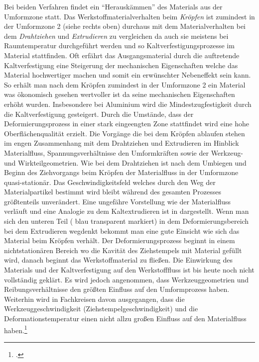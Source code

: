\documentclass[12pt,a4paper,parskip]{scrartcl}
\begin{document}
Bei beiden Verfahren findet ein "`Herauskämmen"' des Materials aus der Umformzone statt. Das Werkstoffmaterialverhalten beim \emph{Kröpfen} ist zumindest in der Umformzone 2 (siehe  rechts oben) durchaus mit dem Materialverhalten bei dem \emph{Drahtziehen} und \emph{Extrudieren} zu vergleichen da auch sie meistens bei Raumtemperatur durchgeführt werden und so Kaltverfestigungsprozesse im Material stattfinden. Oft erfährt das Ausgangsmaterial durch die auftretende Kaltverfestigung        
eine Steigerung der mechanischen Eigenschaften welche das Material hochwertiger machen und somit ein erwünschter Nebeneffekt sein kann. So erhält man nach dem Kröpfen zumindest in der Umformzone 2 ein Material was ökonomisch gesehen wertvoller ist da seine mechanischen Eigenschaften erhöht wurden. Insbesondere bei Aluminium wird die Mindestzugfestigkeit durch die Kaltverfestigung gesteigert. Durch die Umstände, dass der Deformierungsprozess in einer stark eingeengten Zone stattfindet wird eine hohe Oberflächenqualität erzielt. Die Vorgänge die bei dem Kröpfen ablaufen stehen im engen Zusammenhang mit dem Drahtziehen und Extrudieren im Hinblick  Materialfluss, Spannungsverhältnisse den Umformkräften sowie der Werkzeug- und Wirkteilgeometrien. Wie bei dem Drahtziehen ist nach dem Umbiegen und Beginn des Ziehvorgangs beim Kröpfen der Materialfluss in der Umformzone quasi-stationär. Das Geschwindigkeitsfeld welches durch den Weg der Materialpartikel bestimmt wird bleibt während des gesamten Prozesses größtenteils unverändert. Eine ungefähre Vorstellung wie der Materialfluss verläuft und  eine Analogie zu dem Kaltextrudieren ist in  dargestellt. Wenn man sich den unteren Teil ( blau transparent markiert) in dem Deformierungsbereich bei dem Extrudieren wegdenkt bekommt man  eine gute Einsicht wie sich das Material beim Kröpfen verhält. Der Deformierungsprozess beginnt in einem nichtstationären Bereich wo die Kavität des Ziehstempels mit Material gefüllt wird, danach beginnt das  Werkstoffmaterial zu fließen. Die Einwirkung des Materials und der Kaltverfestigung auf den Werkstofffluss ist bis heute noch nicht vollständig geklärt. Es wird jedoch angenommen, dass  
Werkzeuggeometrien und Reibungsverhältnisse den größten Einfluss auf den Umformprozess haben. Weiterhin wird in Fachkreisen davon ausgegangen, dass die Werkzeuggeschwindigkeit (Ziehstempelgeschwindigkeit) und die Deformationstemperatur einen nicht allzu großen Einfluss auf den Materialfluss haben.\footcite[Vgl.][13.10]{kl} 
\end{document}
